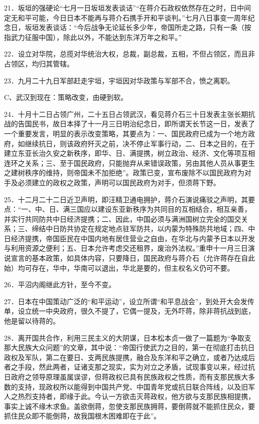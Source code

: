 21．坂垣的强硬论“七月一日坂垣发表谈诘”“在蒋介石政权依然存在之时，日中间定无和平可能，今日日本不能再与蒋介石携手开和平谈判。”七月八日事变一周年纪念日，坂垣发表谈话：“今后战争无论延长多少年，帝国所走之路，只有一条（按指武力征服中国），除此以外，不能达到东洋万年之和平。”

22．设立对华院，总揽对华统治大权，总裁，副总裁，五相，不但占领区，而且非占领区，均归其管辖。

23．九月二十九日军部赶走宇垣，宇垣因对华政策与军部不合，愤之离职。

C、武汉到现在：策略改变，由硬到软。

24．十月十二日占领广州，二十五日占领武汉，看见蒋介石三十日发表主张长期抗战的告国民书，故日本择了十一月三日明治纪念日，即所谓天长节这一日，发表了一个重要发言，明显的表示改变策略，其要点为：一、国民政府已成为一个地方政府，如继续抗日，则该政府歼灭之前，决不停止军事行动，二、日本之目的，在于建立东亚长治久安之新秩序，即华、日、满提携，树立政治、经济、文化等项互相连环之关系；三、至于国民政府，只能抛弃从来错误政策，另由其他人员从事更生之建树秩序的维持，则帝国未不加拒绝”。政策已变，宣布废除不以国民政府为对手及必须建立的政权之政策，声明可以国民政府为对手，但须蒋下野。

25．十二月二十二日近卫声明，即汪精卫通电拥护，蒋介石演说痛驳之声明，其要点：“一、中、日、满三国应以建设东亚新秩序为共同目的互相结合，相互亲善，并实行共同防共中日经济提携；二、因此，中国必须与满洲国树立完全的国交关系；三、缔结中日防共协定在规定地点驻军防共，以内蒙为特殊防共地域；四、中日经济提携，帝国臣民在中国内地有居住营业之自由，在华北与内蒙予日本以开发与利用资源之便利；五、日本允许考虑交还租界，废治外法权。”重申十一月三日演说宣言的基本政策，如具体内容，只要降日，国民政府与蒋介石（允许蒋存在自此始）均可存在，华中，华南可以退出，华北是要的，但主权名义仍可不要。

26．平沼内阁继此方针，至今不变。

27．日本在中国策动广泛的“和平运动”，设立所谓“和平息战会”，到处开大会发传单，设立统一中央政府，很久不提了，它偶一提及，无外吓蒋，除非蒋抗战到底，他是留以待蒋的。

28．离开国共合作，利用三民主义的大阴谋，日本松本贞一做了一篇题为“争取支那大民族大众问题”的文章，其中说：“帝国行使武力之目的，第一在彻底打击抗日政权及军队，第二在要日、支两民族提携，融合及东洋和平之确立，或者乃达成后者之手段，然此两者，证诸支那之现实，实为对立之矛盾，试现事变以来，经过抗日政府之领导原理虽属误谬，但蒋政权已具有民族政权之性质，而有支那民族大多数的支持，现政权所以能得到中国共产党、中国青年党或抗日联合阵线，以及旧军人之热烈支持者，即缘于此。今认一方欲击灭蒋政权，他方欲与支那民族相提携，事实上诚不缘木求鱼。盖欲倒蒋，忽使支那民族拥蒋，要倒蒋就不能抓住民众，要抓住民众即不能倒蒋，故我国根木困难即在于此”。

